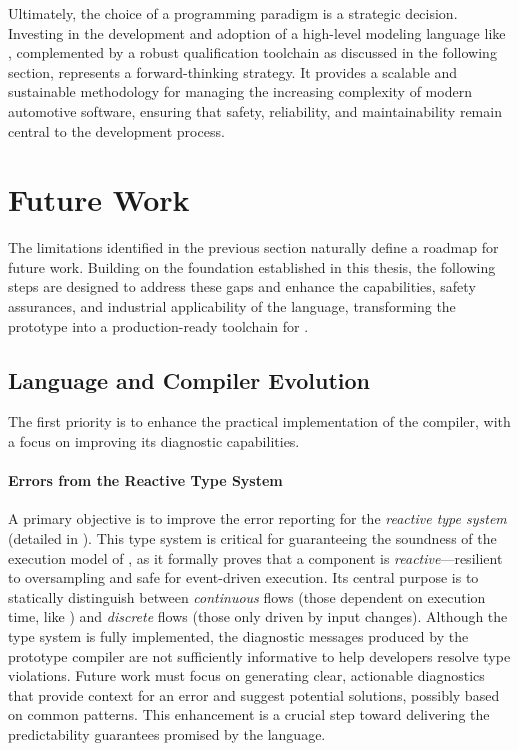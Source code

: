 Ultimately, the choice of a programming paradigm is a strategic decision. Investing in the
development and adoption of a high-level modeling language like \GRust, complemented by a robust
qualification toolchain as discussed in the following section, represents a forward-thinking
strategy. It provides a scalable and sustainable methodology for managing the increasing complexity
of modern automotive software, ensuring that safety, reliability, and maintainability remain central
to the development process.

\section{Future Work}
\label{sec:conclusion:future_work}

The limitations identified in the previous section naturally define a roadmap for future work.
Building on the foundation established in this thesis, the following steps are designed to address
these gaps and enhance the capabilities, safety assurances, and industrial applicability of the
language, transforming the \GRust prototype into a production-ready toolchain for \sdv.

\subsection{Language and Compiler Evolution}

The first priority is to enhance the practical implementation of the \GRust compiler, with a focus
on improving its diagnostic capabilities.

\paragraph{Errors from the Reactive Type System}
A primary objective is to improve the error reporting for the \emph{reactive type system} (detailed
in ). This type system is
critical for guaranteeing the soundness of the execution model of \GRust, as it formally proves that
a component is \emph{reactive}---resilient to oversampling and safe for event-driven execution. Its
central purpose is to statically distinguish between \emph{continuous} flows (those dependent on
execution time, like \timeop) and \emph{discrete} flows (those only driven by input changes).
%
Although the type system is fully implemented, the diagnostic messages produced by the prototype
compiler are not sufficiently informative to help developers resolve type violations. Future work
must focus on generating clear, actionable diagnostics that provide context for an error and suggest
potential solutions, possibly based on common patterns. This enhancement is a crucial step toward
delivering the predictability guarantees promised by the \GRust language.

